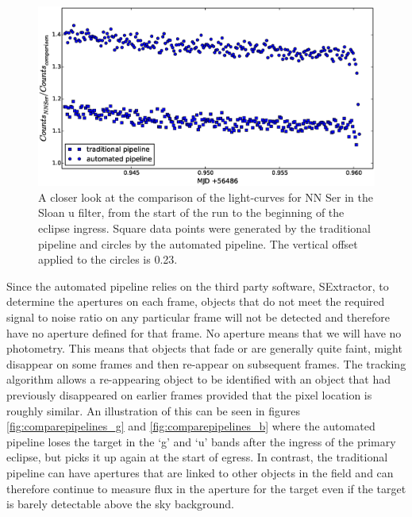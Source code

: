 \begin{figure}
\centering
\includegraphics[width=140mm]{images/nn_ser_compare_zoom_b.eps}
\caption{A closer look at the comparison of the light-curves for NN Ser in the Sloan u filter, from the start of the run to the beginning of the eclipse ingress. Square data points were generated by the traditional pipeline and circles by the automated pipeline. The vertical offset applied to the circles is 0.23. }
\label{fig:comparepipelines_zoom_b}
\end{figure}

Since the automated pipeline relies on the third party software, SExtractor, to determine the apertures on each frame, objects that do not meet the required signal to noise ratio on any particular frame will not be detected and therefore have no aperture defined for that frame. No aperture means that we will have no photometry. This means that objects that fade or are generally quite faint, might disappear on some frames and then re-appear on subsequent frames. The tracking algorithm allows a re-appearing object to be identified with an object that had previously disappeared on earlier frames provided that the pixel location is roughly similar. An illustration of this can be seen in figures \ref{fig:comparepipelines_g} and \ref{fig:comparepipelines_b} where the automated pipeline loses the target in the `g' and `u' bands after the ingress of the primary eclipse, but picks it up again at the start of egress. In contrast, the traditional pipeline can have apertures that are linked to other objects in the field and can therefore continue to measure flux in the aperture for the target even if the target is barely detectable above the sky background.


